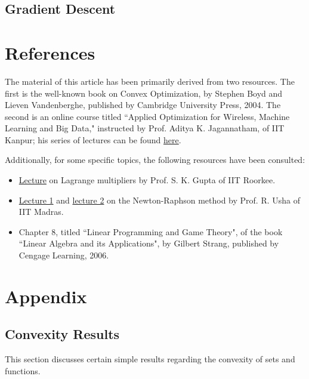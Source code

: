\documentclass[a4paper]{article}
\theoremstyle{definition}
\begin{document}
\subsection{Gradient Descent}

\section{References}

The material of this article has been primarily derived from two resources.
The first is the well-known book on Convex Optimization, by Stephen Boyd and Lieven Vandenberghe, published by Cambridge University Press, 2004.
The second is an online course titled ``Applied Optimization for Wireless, Machine Learning and Big Data," instructed by Prof. Aditya K. Jagannatham, of IIT Kanpur; his series of lectures can be found \href{https://youtube.com/playlist?list=PLFW6lRTa1g83Z2YAcz7kxrcPI2nJK6hjP}{here}.

Additionally, for some specific topics, the following resources have been consulted:
\begin{itemize}
	\item \href{https://youtu.be/GoyeNUaSW08}{Lecture} on Lagrange multipliers by Prof. S. K. Gupta of IIT Roorkee.
	\item \href{https://youtu.be/ZcbFQz_Kwog}{Lecture 1} and \href{https://youtu.be/b74LVxOazIQ}{lecture 2} on the Newton-Raphson method by Prof. R. Usha of IIT Madras.
	\item Chapter 8, titled ``Linear Programming and Game Theory", of the book ``Linear Algebra and its Applications", by Gilbert Strang, published by Cengage Learning, 2006.
\end{itemize}

\appendix

\section{Appendix}

\subsection{Convexity Results}
\label{convexity-results}

This section discusses certain simple results regarding the convexity of sets and functions.
\end{document}
